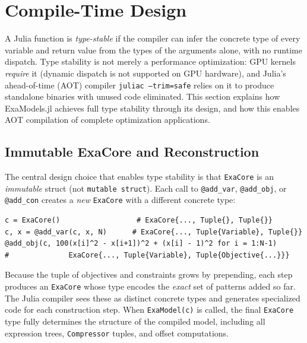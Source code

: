 \documentclass[11pt]{article}
\begin{document}
\section{Compile-Time Design}
\label{sec:aot}

A Julia function is \emph{type-stable} if the compiler can infer the concrete type of every variable and return value from the types of the arguments alone, with no runtime dispatch. Type stability is not merely a performance optimization: GPU kernels \emph{require} it (dynamic dispatch is not supported on GPU hardware), and Julia's ahead-of-time (AOT) compiler \texttt{juliac --trim=safe} relies on it to produce standalone binaries with unused code eliminated. This section explains how ExaModels.jl achieves full type stability through its design, and how this enables AOT compilation of complete optimization applications.

\subsection{Immutable ExaCore and Reconstruction}
\label{sec:aot:exacore}

The central design choice that enables type stability is that \texttt{ExaCore} is an \emph{immutable} struct (not \texttt{mutable struct}). Each call to \texttt{@add\_var}, \texttt{@add\_obj}, or \texttt{@add\_con} creates a \emph{new} \texttt{ExaCore} with a different concrete type:
\begin{lstlisting}
c = ExaCore()                  # ExaCore{..., Tuple{}, Tuple{}}
c, x = @add_var(c, x, N)      # ExaCore{..., Tuple{Variable}, Tuple{}}
@add_obj(c, 100(x[i]^2 - x[i+1])^2 + (x[i] - 1)^2 for i = 1:N-1)
#              ExaCore{..., Tuple{Variable}, Tuple{Objective{...}}}
\end{lstlisting}
Because the tuple of objectives and constraints grows by prepending, each step produces an \texttt{ExaCore} whose type encodes the \emph{exact} set of patterns added so far. The Julia compiler sees these as distinct concrete types and generates specialized code for each construction step. When \texttt{ExaModel(c)} is called, the final \texttt{ExaCore} type fully determines the structure of the compiled model, including all expression trees, \texttt{Compressor} tuples, and offset computations.
\end{document}
